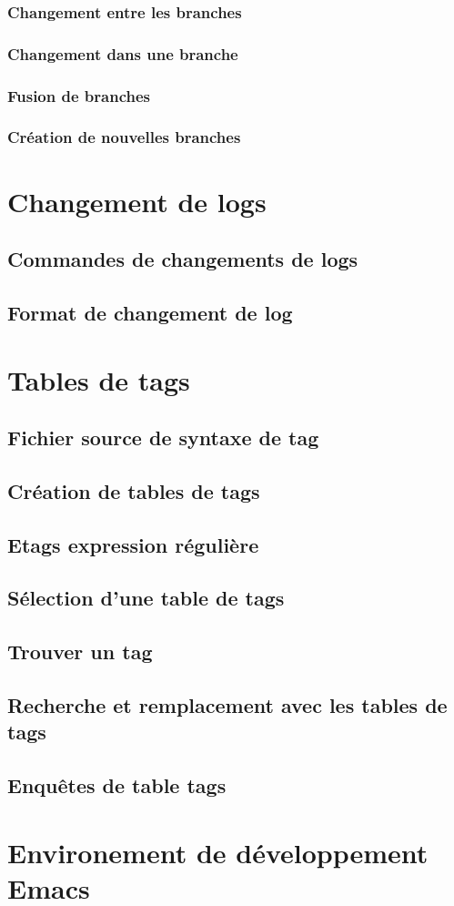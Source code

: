 \subsubsection{Changement entre les branches}
\subsubsection{Changement dans une branche}
\subsubsection{Fusion de branches}
\subsubsection{Création de nouvelles branches}
\section{Changement de logs}\label{chap25sec2} 
\subsection{Commandes de changements de logs}\label{chap25sec2subsec1} 
\subsection{Format de changement de log}\label{chap25sec2subsec2} 
\section{Tables de tags}\label{chap25sec3} 
\subsection{Fichier source de syntaxe de tag}\label{chap25sec3subsec1} 
\subsection{Création de tables de tags}\label{chap25sec3subsec2}
\subsection{Etags expression régulière}\label{chap25sec3subsec3}
\subsection{Sélection d'une table de tags}\label{chap25sec3subsec4}
\subsection{Trouver un tag}\label{chap25sec3subsec5}
\subsection{Recherche et remplacement avec les tables de
  tags}\label{chap25sec3subsec6} 
\subsection{Enquêtes de table tags}\label{chap25sec3subsec7}
\section{Environement de développement Emacs}\label{chap25sec3subsec8}